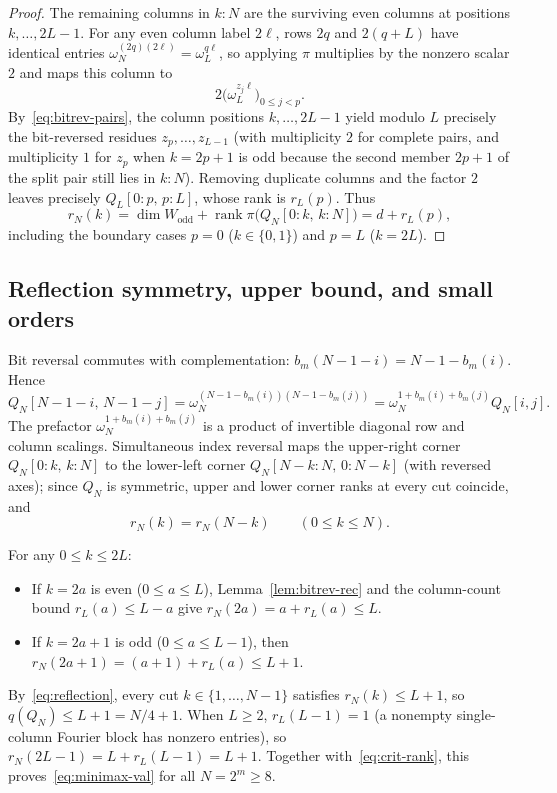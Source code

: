 \documentclass[11pt,reqno]{amsart}
\numberwithin{equation}{section}
\theoremstyle{definition}
\theoremstyle{remark}
\newcommand{\rank}{\operatorname{rank}}
\begin{document}
\begin{proof}
The remaining columns in $k{:}N$ are the surviving even columns at positions $k,\ldots,2L-1$. For any even column label $2\ell$, rows $2q$ and $2(q+L)$ have identical entries $\omega_N^{(2q)(2\ell)} = \omega_L^{q\ell}$, so applying $\pi$ multiplies by the nonzero scalar $2$ and maps this column to
\[
2\bigl(\omega_L^{z_j\ell}\bigr)_{0\le j<p}.
\]
By~\eqref{eq:bitrev-pairs}, the column positions $k,\ldots,2L-1$ yield modulo $L$ precisely the bit-reversed residues $z_p,\ldots,z_{L-1}$ (with multiplicity $2$ for complete pairs, and multiplicity $1$ for $z_p$ when $k=2p+1$ is odd because the second member $2p+1$ of the split pair still lies in $k{:}N$). Removing duplicate columns and the factor $2$ leaves precisely $Q_L[0{:}p,\, p{:}L]$, whose rank is $r_L(p)$. Thus
\[
r_N(k) = \dim W_{\mathrm{odd}} + \rank\pi\bigl(Q_N[0{:}k,\, k{:}N]\bigr) = d + r_L(p),
\]
including the boundary cases $p=0$ ($k\in\{0,1\}$) and $p=L$ ($k=2L$).
\end{proof}

\subsection{Reflection symmetry, upper bound, and small orders}

Bit reversal commutes with complementation: $b_m(N-1-i) = N-1-b_m(i)$. Hence
\[
Q_N[N-1-i,\, N-1-j]
= \omega_N^{(N-1-b_m(i))(N-1-b_m(j))}
= \omega_N^{1 + b_m(i) + b_m(j)} Q_N[i,j].
\]
The prefactor $\omega_N^{1+b_m(i)+b_m(j)}$ is a product of invertible diagonal row and column scalings. Simultaneous index reversal maps the upper-right corner $Q_N[0{:}k,\, k{:}N]$ to the lower-left corner $Q_N[N-k{:}N,\, 0{:}N-k]$ (with reversed axes); since $Q_N$ is symmetric, upper and lower corner ranks at every cut coincide, and
\begin{equation}
\label{eq:reflection}
r_N(k) = r_N(N - k)\qquad (0\le k\le N).
\end{equation}

For any $0\le k\le 2L$:
\begin{itemize}[leftmargin=1.5em]
\item If $k = 2a$ is even ($0\le a\le L$), Lemma~\ref{lem:bitrev-rec} and the column-count bound $r_L(a)\le L-a$ give $r_N(2a) = a + r_L(a) \le L$.
\item If $k = 2a+1$ is odd ($0\le a\le L-1$), then $r_N(2a+1) = (a+1) + r_L(a) \le L + 1$.
\end{itemize}
By~\eqref{eq:reflection}, every cut $k\in\{1,\ldots,N-1\}$ satisfies $r_N(k)\le L+1$, so $q(Q_N)\le L+1 = N/4+1$. When $L\ge 2$, $r_L(L-1)=1$ (a nonempty single-column Fourier block has nonzero entries), so $r_N(2L-1) = L + r_L(L-1) = L+1$. Together with~\eqref{eq:crit-rank}, this proves~\eqref{eq:minimax-val} for all $N=2^m\ge 8$.
\end{document}
